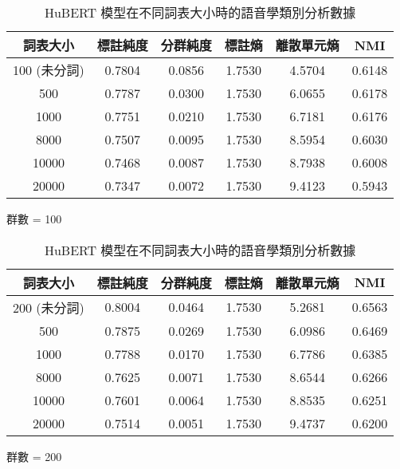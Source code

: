 \begin{table}[!htbp]
            \begin{subtable}[t]{\textwidth}
                \centering
                \begin{tabular}{|c|c|c|c|c|c|} \hline 
                        詞表大小  & 標註純度 & 分群純度 & 標註熵 & 離散單元熵 &     NMI   \\ \hline 
 100 (未分詞)&              0.7804 &   0.0856 &         1.7530 &     4.5704 &  0.6148\\ \hline 
                           500    &  0.7787  &  0.0300  & 1.7530 &  6.0655  &     0.6178  \\ \hline 
                          1000    &  0.7751  &  0.0210  & 1.7530 &  6.7181  &     0.6176  \\ \hline 
                          8000    &  0.7507  &  0.0095  & 1.7530 &  8.5954  &     0.6030  \\ \hline 
                         10000    &  0.7468  &  0.0087  & 1.7530 &  8.7938  &     0.6008  \\ \hline 
                         20000    &  0.7347  &  0.0072  & 1.7530 &  9.4123  &     0.5943  \\ \hline 
                \end{tabular}
\caption{群數 = 100}
                \label{tab:ch4-hubert-pcls-clu100}
            \end{subtable}        

            \vspace{0.01cm}        

            \begin{subtable}[t]{\textwidth}
                \centering
                \begin{tabular}{|c|c|c|c|c|c|} \hline 
                        詞表大小  & 標註純度 & 分群純度 & 標註熵 & 離散單元熵 &     NMI   \\ \hline 
 200 (未分詞)&              0.8004 &   0.0464 &         1.7530 &     5.2681 &  0.6563\\ \hline 
                           500    &  0.7875  &  0.0269  & 1.7530 &  6.0986  &     0.6469  \\ \hline 
                          1000    &  0.7788  &  0.0170  & 1.7530 &  6.7786  &     0.6385  \\ \hline 
                          8000    &  0.7625  &  0.0071  & 1.7530 &  8.6544  &     0.6266  \\ \hline 
                         10000    &  0.7601  &  0.0064  & 1.7530 &  8.8535  &     0.6251  \\ \hline 
                         20000    &  0.7514  &  0.0051  & 1.7530 &  9.4737  &     0.6200   \\ \hline
                \end{tabular}
\caption{群數 = 200}
                \label{tab:ch4-hubert-pcls-clu200}
            \end{subtable}        

\caption{HuBERT 模型在不同詞表大小時的語音學類別分析數據}
            \label{tab:hubert-pcls-results}
        \end{table}

